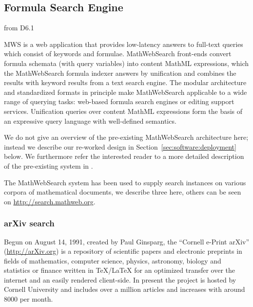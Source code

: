 \def\MWS{\textsf{MathWebSearch}\xspace}


\subsection{Formula Search Engine}


\begin{newpart}{from D6.1}

MWS is a web application that provides low-latency answers to full-text queries which consist of keywords and formulae.
\MWS front-ends convert formula schemata (with query variables) into content MathML expressions, which the \MWS formula indexer answers by unification and combines the results with keyword results from a text search engine.
The modular architecture and standardized formats in principle make \MWS applicable to a wide range of querying tasks:
web-based formula search engines or editing support services. 
Unification queries over content MathML expressions form the basis of an expressive query language with well-defined semantics.

We do not give an overview of the pre-existing \MWS architecture here; instead we describe our re-worked design in Section~\ref{sec:software:deployment} below. 
We furthermore refer the interested reader to a more detailed description of the pre-existing system in . 

The \MWS system has been used to supply search instances on various corpora of mathematical documents, we describe three here, others can be seen on \url{http://search.mathweb.org}. 

\subsubsection{arXiv search}

Begun on August 14, 1991, created by Paul Ginsparg, the ``Cornell e-Print arXiv''
(\url{http://arXiv.org}) is a repository of scientific papers and electronic preprints in
fields of mathematics, computer science, physics, astronomy, biology and statistics or
finance written in {\TeX/\LaTeX} for an optimized transfer over the internet and an easily
rendered client-side. In present the project is hosted by Cornell University and includes
over a million articles and increases with around 8000 per month.


\end{newpart}
